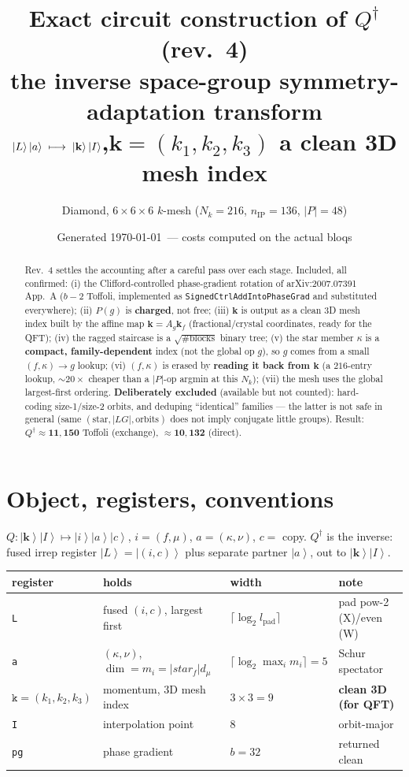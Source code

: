 \documentclass[11pt]{article}
\title{\bf Exact circuit construction of $Q^\dagger$ (rev.\ 4)\\[2pt]
\large the inverse space-group symmetry-adaptation transform\\
$\ket{L}\ket{a}\;\longmapsto\;\ket{\mathbf k}\ket{I}$,\quad $\mathbf k=(k_1,k_2,k_3)$ a clean 3D mesh index}
\author{Diamond, $6\times6\times6$ $k$-mesh ($N_k=216$, $n_{\mathrm{IP}}=136$, $|P|=48$)}
\date{Generated \today\ --- costs computed on the actual bloqs}
\newcommand{\ket}[1]{\left|#1\right\rangle}
\newcommand{\reg}[1]{\texttt{#1}}
\begin{document}
\maketitle

\begin{abstract}
Rev.\ 4 settles the accounting after a careful pass over each stage. Included, all confirmed:
(i) the Clifford-controlled phase-gradient rotation of arXiv:2007.07391 App.\ A ($b-2$ Toffoli,
implemented as \texttt{SignedCtrlAddIntoPhaseGrad} and substituted everywhere);
(ii) $P(g)$ is \textbf{charged}, not free; (iii) $\mathbf k$ is output as a clean 3D mesh index
built by the affine map $\mathbf k=A_g\mathbf k_f$ (fractional/crystal coordinates, ready for the
QFT); (iv) the ragged staircase is a $\sqrt{\#\mathrm{blocks}}$ binary tree; (v) the star member
$\kappa$ is a \textbf{compact, family-dependent} index (not the global op $g$), so $g$ comes from a
small $(f,\kappa)\!\to\!g$ lookup; (vi) $(f,\kappa)$ is erased by \textbf{reading it back from
$\mathbf k$} (a $216$-entry lookup, $\sim\!20\times$ cheaper than a $|P|$-op argmin at this $N_k$);
(vii) the mesh uses the global largest-first ordering. \textbf{Deliberately excluded} (available but
not counted): hard-coding size-1/size-2 orbits, and deduping ``identical'' families --- the latter is
not safe in general (same $(\text{star},|LG|,\text{orbits})$ does not imply conjugate little groups).
Result: $Q^\dagger \approx \mathbf{11{,}150}$ Toffoli (exchange), $\approx \mathbf{10{,}132}$ (direct).
\end{abstract}

\tableofcontents

\section{Object, registers, conventions}

$Q:\ket{\mathbf k}\ket{I}\mapsto\ket{i}\ket{a}\ket{c}$, $i=(f,\mu)$, $a=(\kappa,\nu)$, $c=$ copy.
$Q^\dagger$ is the inverse: fused irrep register $\ket{L}=\ket{(i,c)}$ plus separate partner
$\ket{a}$, out to $\ket{\mathbf k}\ket{I}$.

\begin{center}
\begin{tabular}{@{}llll@{}}
\toprule
register & holds & width & note \\ \midrule
\reg{L}   & fused $(i,c)$, largest first & $\lceil\log_2 l_{\mathrm{pad}}\rceil$ & pad pow-2 (X)/even (W) \\
\reg{a}   & $(\kappa,\nu)$, $\dim=m_i=|star_f|d_\mu$ & $\lceil\log_2\max_i m_i\rceil=5$ & Schur spectator \\
$\reg{k}=(k_1,k_2,k_3)$ & momentum, 3D mesh index & $3\times3=9$ & \textbf{clean 3D (for QFT)} \\
\reg{I}   & interpolation point & $8$ & orbit-major \\
\reg{pg}  & phase gradient & $b=32$ & returned clean \\
\bottomrule
\end{tabular}
\end{center}
\end{document}
